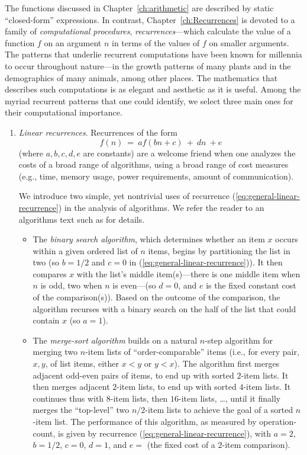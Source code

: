 The functions discussed in Chapter~\ref{ch:arithmetic} are described
by static ``closed-form'' expressions.  In contrast,
Chapter~\ref{ch:Recurrences} is devoted to a family of {\em
  computational procedures}, {\it recurrences}---which calculate the
value of a function $f$ on an argument $n$ in terms of the values of
$f$ on smaller arguments.  The patterns that underlie recurrent
computations have been known for millennia to occur throughout
nature---in the growth patterns of many plants and in the demographics
of many animals, among other places.  The mathematics that describes
such computations is as elegant and aesthetic as it is useful.  Among
the myriad recurrent patterns that one could identify, we select three
main ones for their computational importance.
\begin{enumerate}
\item
{\it Linear recurrences}.  Recurrences of the form
\begin{equation}
\label{eq:general-linear-recurrence}
f(n) \ = \ a f(bn+c) \ + \ dn \ + e
\end{equation}
(where $a, b, c, d, e$ are constants) are a welcome friend when one
analyzes the costs of a broad range of algorithms, using a broad range
of cost measures (e.g., time, memory usage, power requirements, amount
of communication).

We introduce two simple, yet nontrivial uses of recurrence
(\ref{eq:general-linear-recurrence}) in the analysis of algorithms.
We refer the reader to an algorithms text such as \cite{CLRS} for
details.
  \begin{itemize}
  \item
The {\em binary search algorithm}, which determines whether an item
$x$ occurs within a given ordered list of $n$ items, begins by
partitioning the list in two (so $b = 1/2$ and $c = 0$ in
(\ref{eq:general-linear-recurrence})).  It then compares $x$ with the
list's middle item(s)---there is one middle item when $n$ is odd, two
when $n$ is even---(so $d = 0$, and $e$ is the fixed constant cost of
the comparison(s)).  Based on the outcome of the comparison, the
algorithm recurses with a binary search on the half of the list that
could contain $x$ (so $a = 1$).

  \item
The {\em merge-sort algorithm} builds on a natural $n$-step algorithm
for merging two $n$-item lists of ``order-comparable'' items (i.e.,
for every pair, $x,y$, of list items, either $x < y$ or $y < x$).  The
algorithm first merges adjacent odd-even pairs of items, to end up
with sorted $2$-item lists.  It then merges adjacent $2$-item lists,
to end up with sorted $4$-item lists.  It continues thus with $8$-item
lists, then $16$-item lists, \ldots, until it finally merges the
``top-level'' two $n/2$-item lists to achieve the goal of a sorted
$n$-item list.  The performance of this algorithm, as measured by
operation-count, is given by recurrence
(\ref{eq:general-linear-recurrence}), with $a=2$, $b = 1/2$, $c = 0$,
$d=1$, and $e =$ (the fixed cost of a $2$-item comparison).
  \end{itemize}



\end{enumerate}

